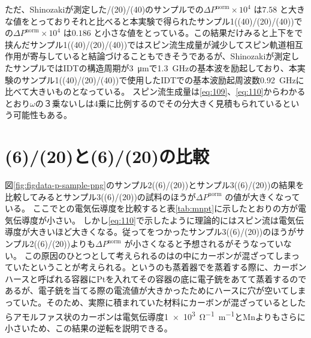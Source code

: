 \documentclass[dvipdfmx,11pt]{jsreport}
\numberwithin{equation}{chapter}
\numberwithin{table}{chapter}
\begin{document}
ただ、Shinozakiが測定した/(20)/(40)のサンプルでの$\Delta P^{\text{norm}}\times 10^{4}$ は$7.58$ と大きな値をとっておりそれと比べると本実験で得られたサンプル1((40)/(20)/(40))での$\Delta P^{\text{norm}}\times 10^{4}$ は$0.186$ と小さな値をとっている。この結果だけみると上下をで挟んだサンプル1((40)/(20)/(40))ではスピン流生成量が減少してスピン軌道相互作用が寄与していると結論づけることもできそうであるが、Shinozakiが測定したサンプルではIDTの構造周期が\SI{3}{\micro \metre}で\SI{1.3}{\giga \hertz}の基本波を励起しており、本実験のサンプル1((40)/(20)/(40))で使用したIDTでの基本波励起周波数\SI{0.92}{\giga \hertz}に比べて大きいものとなっている。
スピン流生成量は\eqref{eq:109}、\eqref{eq:110}からわかるとおり$\omega$の３乗ないしは4乗に比例するのでその分大きく見積もられているという可能性もある。
\section{(6)/(20)と(6)/(20)の比較}
図\ref{fig:figdata-p-sample-png}のサンプル2((6)/(20))とサンプル3((6)/(20))の結果を比較してみるとサンプル3((6)/(20))の試料のほうが$\Delta P^{\text{norm}}$ の値が大きくなっている。
ここでとの電気伝導度を比較すると表\ref{tab:mnpt}に示したとおりの方が電気伝導度が小さい。
しかし\eqref{eq:110}で示したように理論的にはスピン流は電気伝導度が大きいほど大きくなる。従ってをつかったサンプル3((6)/(20))のほうがサンプル2((6)/(20))よりも$\Delta P^{\text{norm}}$ が小さくなると予想されるがそうなっていない。
この原因のひとつとして考えられるのはの中にカーボンが混ざってしまっていたということが考えられる。というのも蒸着器でを蒸着する際に、カーボンハースと呼ばれる容器にPtを入れてその容器の底に電子銃をあてて蒸着するのであるが、電子銃を当てる際の電流値が大きかったためにハースに穴が空いてしまっていた。そのため、実際に積まれていた材料にカーボンが混ざっているとしたらアモルファス状のカーボンは電気伝導度\SI{1e3}{\ohm^{-1}\metre ^{-1}}とMnよりもさらに小さいため、この結果の逆転を説明できる。
\end{document}
